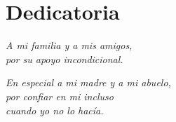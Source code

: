 \chapter*{Dedicatoria}
\thispagestyle{empty}
\vspace*{5cm}
\begin{flushright}
\textit{A mi familia y a mis amigos,\\
por su apoyo incondicional.}
\end{flushright}
\vspace*{2cm}
\begin{flushright}
\textit{En especial a mi madre y a mi abuelo,\\
por confiar en mi incluso \\
cuando yo no lo hacía.}
\end{flushright}
\newpage

